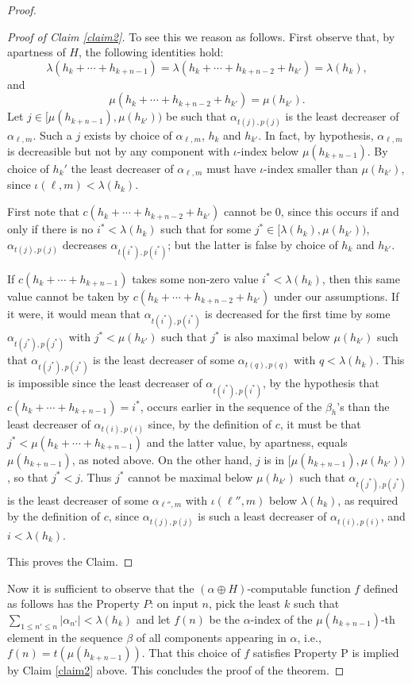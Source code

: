 \documentclass[10pt,a4paper]{amsart}
\begin{document}
\begin{proof}
\begin{proof}[Proof of Claim \ref{claim2}]
To see this we reason as follows. First observe that, by apartness of $H$, the following identities hold:
$$\lambda(h_k + \cdots + h_{k+n-1}) = \lambda(h_k + \cdots + h_{k+n-2} + h_{k'}) = \lambda(h_k),$$
and
$$\mu(h_k + \cdots + h_{k+n-2} + h_{k'})=\mu(h_{k'}).$$
Let $j \in [\mu(h_{k+n-1}), \mu(h_{k'}))$ be such that $\alpha_{t(j),p(j)}$ is the least decreaser of $\alpha_{\ell,m}$. Such a $j$ exists by choice of $\alpha_{\ell,m}$, $h_k$ and $h_{k'}$. In fact, by hypothesis, 
$\alpha_{\ell,m}$ is decreasible but not by any component with $\iota$-index below $\mu(h_{k+n-1})$. By choice
of $h_k'$ the least decreaser of $\alpha_{\ell,m}$ must have $\iota$-index smaller than $\mu(h_{k'})$, since $\iota(\ell,m) < \lambda(h_k)$.

First note that
$c(h_k + \cdots + h_{k+n-2} + h_{k'})$ cannot be $0$, 
since this occurs if and only if there is no $i^* < \lambda(h_k)$ such that for some $j^* \in [\lambda(h_k), \mu(h_{k'}))$, $\alpha_{t(j),p(j)}$ decreases $\alpha_{t(i^*), p(i^*)}$; but the latter is false by choice of $h_k$ and $h_{k'}$. 

If $c(h_k + \cdots + h_{k+n-1})$ takes some non-zero value $i^* < \lambda(h_k)$, then this same value cannot
be taken by $c(h_k + \cdots + h_{k+n-2} + h_{k'})$ under our assumptions. 
If it were, it would mean that $\alpha_{t(i^*),p(i^*)}$ is decreased for the 
first time by some $\alpha_{t(j^*), p(j^*)}$ with $j^* < \mu(h_{k'})$ such that $j^*$ is also maximal below $\mu(h_{k'})$ such that $\alpha_{t(j^*), p(j^*)}$ is the least decreaser of some $\alpha_{t(q),p(q)}$ with  $q < \lambda(h_k)$. This is impossible since the least decreaser of $\alpha_{t(i^*),p(i^*)}$, by the hypothesis that $c(h_k + \cdots + h_{k+n-1})=i^*$, occurs earlier in the sequence of the $\beta_h$'s than the least decreaser of $\alpha_{t(i),p(i)}$ since, by the definition of $c$, it must be that $j^* < \mu(h_k + \cdots + h_{k+n-1})$ and the latter value, by apartness, equals $\mu(h_{k+n-1})$, as noted above. On the other hand, $j$ is in $[\mu(h_{k+n-1}), \mu(h_{k'}))$, so that $j^*<j$. Thus $j^*$ cannot be maximal below $\mu(h_{k'})$ such that $\alpha_{t(j^*),p(j^*)}$ is the least decreaser of some $\alpha_{\ell'',m}$ with $\iota(\ell'',m)$ below $\lambda(h_k)$, as required by the definition of $c$, since $\alpha_{t(j),p(j)}$ is such a least decreaser of $\alpha_{t(i),p(i)}$, and $i<\lambda(h_k)$. 

This proves the Claim.
\end{proof}

Now it is sufficient to observe that the $(\alpha \oplus H)$-computable function 
$f$ defined as follows has the Property $P$: on input $n$, 
pick the least $k$ such that $\sum_{1\leq n' \leq n} |\alpha_{n'}| < \lambda(h_k)$ and 
let $f(n)$ be the $\alpha$-index of the $\mu(h_{k+n-1})$-th 
element in the sequence $\beta$ of all components appearing in $\alpha$, i.e., $f(n) = t(\mu(h_{k+n-1}))$. 
That this choice of $f$ satisfies Property P is implied by Claim \ref{claim2} above. This concludes the proof of the theorem.
\end{proof}
\end{document}
